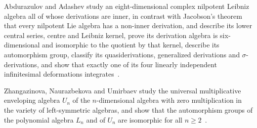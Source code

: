 Abdurazulov and Adashev study an eight-dimensional complex nilpotent Leibniz algebra all of whose derivations are inner, in contrast with Jacobson's theorem that every nilpotent Lie algebra has a non-inner derivation, and describe its lower central series, centre and Leibniz kernel, prove its derivation algebra is six-dimensional and isomorphic to the quotient by that kernel, describe its automorphism group, classify its quasiderivations, generalized derivations and $\sigma$-derivations, and show that exactly one of its four linearly independent infinitesimal deformations integrates~\cite{WlAnEightDimensionalNilpotentLei2026}.

Zhangazinova, Naurazbekova and Umirbaev study the universal multiplicative enveloping algebra $U_n$ of the $n$-dimensional algebra with zero multiplication in the variety of left-symmetric algebras, and show that the automorphism groups of the polynomial algebra $L_n$ and of $U_n$ are isomorphic for all $n\geq 2$~\cite{WlAutomorphismsAndDerivationsOfA2025}.
